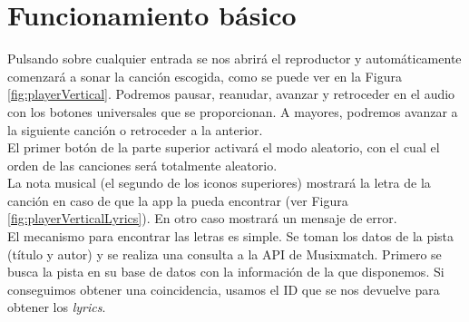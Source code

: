\documentclass[10pt,a4paper]{article}
\begin{document}
\section{Funcionamiento básico}
Pulsando sobre cualquier entrada se nos abrirá el reproductor y automáticamente comenzará a sonar la canción escogida, como se puede ver en la Figura \ref{fig:playerVertical}. Podremos pausar, reanudar, avanzar y retroceder en el audio con los botones universales que se proporcionan. A mayores, podremos avanzar a la siguiente canción o retroceder a la anterior.\\

El primer botón de la parte superior activará el modo aleatorio, con el cual el orden de las canciones será totalmente aleatorio.\\

La nota musical (el segundo de los iconos superiores) mostrará la letra de la canción en caso de que la app la pueda encontrar (ver Figura \ref{fig:playerVerticalLyrics}). En otro caso mostrará un mensaje de error. \\El mecanismo para encontrar las letras es simple. Se toman los datos de la pista (título y autor) y se realiza una consulta a la API de Musixmatch. Primero se busca la pista en su base de datos con la información de la que disponemos. Si conseguimos obtener una coincidencia, usamos el ID que se nos devuelve para obtener los \textit{lyrics}.\\
\end{document}

